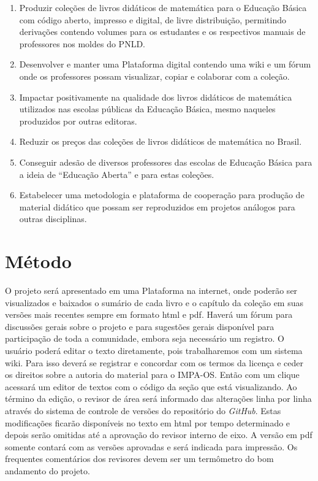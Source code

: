 \documentclass[10 pt]{article}
\begin{document}
\begin{enumerate} [\quad a)] %
  \item     Produzir coleções de livros didáticos de matemática para o Educação Básica com código aberto, impresso e digital, de livre distribuição, permitindo derivações contendo volumes para os estudantes e os respectivos manuais de professores nos moldes do PNLD.
  \item     Desenvolver e manter uma Plataforma digital contendo uma wiki e um fórum onde os professores possam visualizar, copiar e colaborar com a coleção.
  \item     Impactar positivamente na qualidade dos livros didáticos de matemática utilizados nas escolas públicas da Educação  Básica, mesmo naqueles produzidos por outras editoras.
  \item     Reduzir os preços das coleções de livros didáticos de matemática no Brasil.
  \item     Conseguir adesão de diversos professores das escolas de Educação Básica para a ideia de ``Educação Aberta'' e para estas coleções.
  \item     Estabelecer uma metodologia e plataforma de cooperação para produção de material didático que possam ser reproduzidos em projetos análogos para outras disciplinas.
\end{enumerate} %



\section{Método}

O projeto será apresentado em uma Plataforma na internet, onde poderão ser visualizados e baixados o sumário de cada livro e o capítulo da coleção em suas versões mais recentes sempre em formato html e pdf.
Haverá um fórum para discussões gerais sobre o projeto e para sugestões gerais disponível para participação de toda a comunidade, embora seja necessário um registro.
O usuário poderá editar o texto diretamente, pois trabalharemos com um sistema wiki.
Para isso deverá se registrar e concordar com os termos da licença e ceder os direitos sobre a autoria do material para o IMPA-OS.
Então com um clique acessará um editor de textos com o código da seção que está visualizando.
Ao término da edição, o revisor de área será informado das alterações linha por linha através do sistema de controle de versões do repositório do  {\it GitHub}.
Estas modificações ficarão disponíveis no texto em html por tempo determinado e depois serão omitidas até a aprovação do revisor interno de eixo. 
A versão em pdf somente contará com as versões aprovadas e será indicada para impressão.
Os frequentes comentários dos revisores devem ser um termômetro do bom andamento do projeto.
\end{document}

